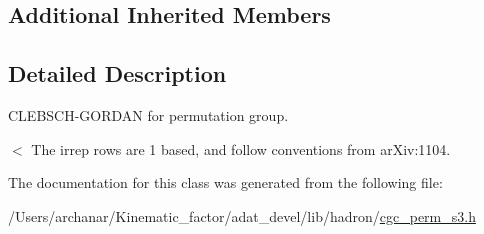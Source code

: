 \subsection*{Additional Inherited Members}


\subsection{Detailed Description}
C\+L\+E\+B\+S\+C\+H-\/\+G\+O\+R\+D\+AN for permutation group. 

$<$ The irrep rows are 1 based, and follow conventions from ar\+Xiv\+:1104. 

The documentation for this class was generated from the following file\+:\begin{DoxyCompactItemize}
\item 
/\+Users/archanar/\+Kinematic\+\_\+factor/adat\+\_\+devel/lib/hadron/\mbox{\hyperlink{lib_2hadron_2cgc__perm__s3_8h}{cgc\+\_\+perm\+\_\+s3.\+h}}\end{DoxyCompactItemize}
